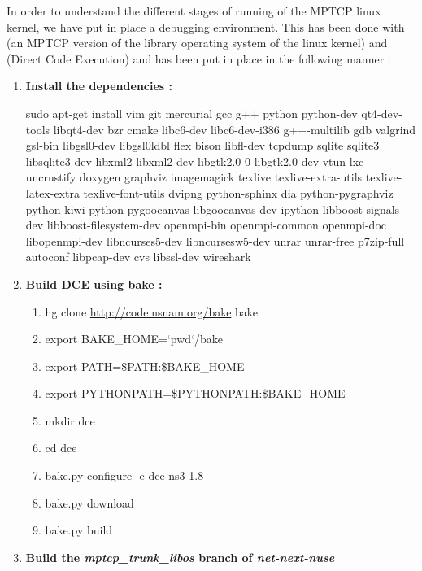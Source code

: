\documentclass[a4paper,11pt]{article}
\begin{document}
		\label{sec:mptcpdebug}

		In order to understand the different stages of running of the MPTCP linux kernel, we have put in place a debugging environment. This has been done with \cite[LibOS]{libos} (an MPTCP version of the library operating system of the linux kernel) and \cite[DCE]{dce} (Direct Code Execution) and has been put in place in the following manner :

		\begin{enumerate}
			\sloppy
			\item \textbf{Install the dependencies :}
				
			\nohyphens{
				sudo apt-get install vim git mercurial gcc g++ python python-dev qt4-dev-tools libqt4-dev bzr cmake libc6-dev libc6-dev-i386 g++-multilib gdb valgrind gsl-bin libgsl0-dev libgsl0ldbl flex bison libfl-dev tcpdump sqlite sqlite3 libsqlite3-dev libxml2 libxml2-dev libgtk2.0-0 libgtk2.0-dev vtun lxc uncrustify doxygen graphviz imagemagick texlive texlive-extra-utils texlive-latex-extra texlive-font-utils dvipng python-sphinx dia python-pygraphviz python-kiwi python-pygoocanvas libgoocanvas-dev ipython libboost-signals-dev libboost-filesystem-dev openmpi-bin openmpi-common openmpi-doc libopenmpi-dev libncurses5-dev libncursesw5-dev unrar unrar-free p7zip-full autoconf libpcap-dev cvs libssl-dev wireshark}

			\item \textbf{Build DCE using bake :}

				\begin{enumerate}

					\item hg clone \url{http://code.nsnam.org/bake} bake
					\item export BAKE\_HOME=`pwd`/bake
					\item export PATH=\$PATH:\$BAKE\_HOME
					\item export PYTHONPATH=\$PYTHONPATH:\$BAKE\_HOME
					\item mkdir dce
					\item cd dce
					\item bake.py configure -e dce-ns3-1.8
					\item bake.py download
					\item bake.py build

				\end{enumerate}

			\item \textbf{Build the \emph{mptcp\_trunk\_libos} branch of \emph{net-next-nuse}}
				\begin{enumerate}


\end{enumerate}
\end{enumerate}
\end{document}
